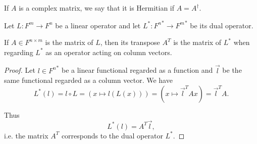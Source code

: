 \begin{definition}\label{def:hermitian_matrix}
  If \( A \) is a complex matrix, we say that it is Hermitian if \( A = A^\dagger \).
\end{definition}

\begin{proposition}\label{thm:dual_linear_operator_matrix_transpose}
  Let \( L: F^m \to F^n \) be a linear operator and let \( L^*: {F^n}^* \to {F^m}^* \) be its dual operator.

  If \( A \in F^{n \times m} \) is the matrix of \( L \), then its transpose \( A^T \) is the matrix of \( L^* \) when regarding \( L^* \) as an operator acting on column vectors.
\end{proposition}
\begin{proof}
  Let \( l \in {F^n}^* \) be a linear functional regarded as a function and \( \vec l \) be the same functional regarded as a column vector. We have
  \begin{equation*}
    L^*(l)
    =
    l \circ L
    =
    (x \mapsto l(L(x)))
    =
    (x \mapsto \vec l^T Ax)
    =
    \vec l^T A.
  \end{equation*}

  Thus
  \begin{equation*}
    L^*(l) = A^T \vec l,
  \end{equation*}
  i.e. the matrix \( A^T \) corresponds to the dual operator \( L^* \).
\end{proof}

